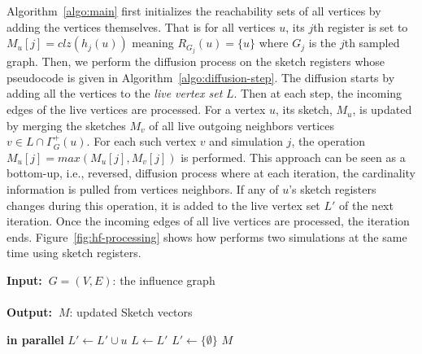 \documentclass[review]{elsarticle}
\renewcommand{\algorithmicrequire}{\textbf{Input:~}}
\renewcommand{\algorithmicensure}{\textbf{Output:~}}
\newcommand\acro{{\sc{HyperFuseR\xspace}\xspace}\xspace}
\newcommand\kktodo[1]{\textcolor{red}{#1}}
\begin{document}
 Algorithm~\ref{algo:main} first initializes the reachability sets of all vertices by adding the vertices themselves. 
 That is for all vertices $u$, its $j$th register is set to $M_u[j]=clz(h_j(u))$ meaning $R_{{G}_j}(u) = \{u\}$ where $G_j$ is the $j$th sampled graph. 
 Then, we perform the diffusion process on the sketch registers whose pseudocode is given in Algorithm~\ref{algo:diffusion-step}. The diffusion starts by adding all the vertices to the {\em live vertex set} $L$. 
 Then at each step, the incoming edges of the live vertices are processed. 
 For a vertex $u$, its sketch, $M_u$, is updated by merging the sketches $M_v$ of all live outgoing neighbors vertices $v \in {L} \cap \Gamma^+_{G}(u)$. For each such vertex $v$ and simulation $j$, the operation $M_u[j] = max(M_u[j], M_v[j])$ is performed. This approach can be seen as a bottom-up, i.e., reversed,  diffusion process where at each iteration, the cardinality information is pulled from vertices neighbors.
If any of $u$'s sketch registers changes during this operation, it is added to the live vertex set $L'$ of the next iteration. Once the incoming edges of all live vertices are processed, the iteration ends. Figure~\ref{fig:hf-processing} shows how \acro performs two simulations at the same time using sketch registers.
 
 
\renewcommand{\baselinestretch}{0.95}
\begin{algorithm}[!ht]
\caption{($G,M,{\cal J},R_S$)}
\label{algo:diffusion-step}
\algorithmicrequire{$G = (V,E)$: the influence graph
\\
\\}
\algorithmicensure{$M$: updated Sketch vectors
}
\begin{algorithmic}[1]
         {\bf in parallel} \label{ln:inner_start} %
            \For{$j \in (0,{\cal J}]$} \label{ln:vec1}
                 \label{ln:early_exit}
                    \label{ln:update}          
                \EndIf
            \EndFor
                \State $L' \leftarrow L' \cup u $ \label{ln:inner_end}
            \EndIf
        \EndFor
        \EndFor
        \State $L \leftarrow L'$
        \State $L' \leftarrow \{\emptyset\}$
    \EndWhile
    \State \Return $M$
\end{algorithmic}
\end{algorithm}
\renewcommand{\baselinestretch}{1}
\end{document}
